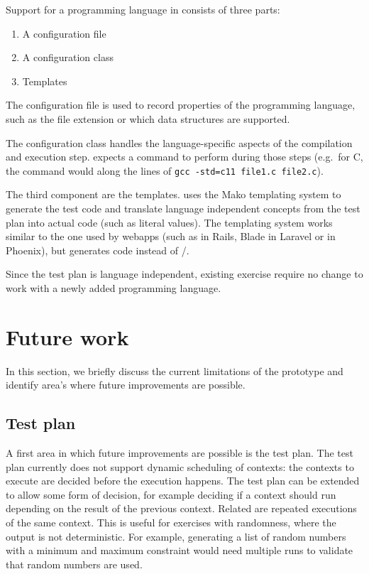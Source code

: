\documentclass[5p,number]{elsarticle}
\begin{document}
    Support for a programming language in \tested{} consists of three parts:

    \begin{enumerate}
        \item A configuration file
        \item A configuration class
        \item Templates
    \end{enumerate}

    The configuration file is used to record properties of the programming language, such as the file extension or which data structures are supported.

    The configuration class handles the language-specific aspects of the compilation and execution step.
    \tested{} expects a command to perform during those steps (e.g.\ for C, the command would along the lines of \texttt{gcc -std=c11 file1.c file2.c}).

    The third component are the templates.
    \tested{} uses the Mako templating system \cite{mako} to generate the test code and translate language independent concepts from the test plan into actual code (such as literal values).
    The templating system works similar to the one used by webapps (such as  in Rails, Blade in Laravel or  in Phoenix), but generates code instead of /.
    
    Since the test plan is language independent, existing exercise require no change to work with a newly added programming language.
    
    \section{Future work}\label{sec:future-work}
    
    In this section, we briefly discuss the current limitations of the prototype and identify area's where future improvements are possible.
    
    \subsection{Test plan}\label{subsec:test-plan}

    A first area in which future improvements are possible is the test plan.
    The test plan currently does not support dynamic scheduling of contexts: the contexts to execute are decided before the execution happens.
    The test plan can be extended to allow some form of decision, for example deciding if a context should run depending on the result of the previous context.
    Related are repeated executions of the same context.
    This is useful for exercises with randomness, where the output is not deterministic.
    For example, generating a list of random numbers with a minimum and maximum constraint would need multiple runs to validate that random numbers are used.
    
\end{document}
